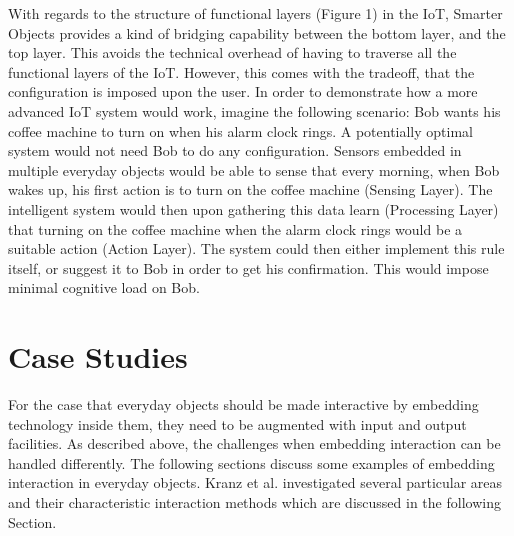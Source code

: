 With regards to the structure of functional layers (Figure 1) in the IoT, Smarter Objects provides a kind of bridging capability between the bottom layer, and the top layer.
This avoids the technical overhead of having to traverse all the functional layers of the IoT.
However, this comes with the tradeoff, that the configuration is imposed upon the user. 
In order to demonstrate how a more advanced IoT system would work, imagine the following scenario: Bob wants his coffee machine to turn on when his alarm clock rings.
A potentially optimal system would not need Bob to do any configuration.
Sensors embedded in multiple everyday objects would be able to sense that every morning, when Bob wakes up, his first action is to turn on the coffee machine (Sensing Layer).
The intelligent system would then upon gathering this data learn (Processing Layer) that turning on the coffee machine when the alarm clock rings would be a suitable action (Action Layer).
The system could then either implement this rule itself, or suggest it to Bob in order to get his confirmation.
This would impose minimal cognitive load on Bob. 

\section{Case Studies}
\label{sec:caseStudies}
For the case that everyday objects should be made interactive by embedding technology inside them, they need to be augmented with input and output facilities.
As described above, the challenges when embedding interaction can be handled differently.
The following sections discuss some examples of embedding interaction in everyday objects.
Kranz et al. investigated several particular areas and their characteristic interaction methods \cite{kranz10} which are discussed in the following Section.

